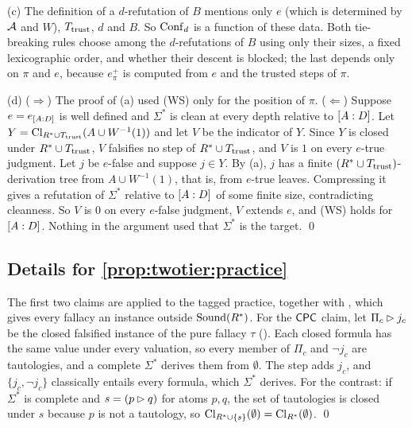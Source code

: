 (c) The definition of a $d$-refutation of $B$ mentions only $e$ (which is determined by $\mathcal{A}$ and $W$), $T_{\mathrm{trust}}$, $d$ and $B$. So $\mathrm{Conf}_d$ is a function of these data. Both tie-breaking rules choose among the $d$-refutations of $B$ using only their sizes, a fixed lexicographic order, and whether their descent is blocked; the last depends only on $\pi$ and $e$, because $e^+_\pi$ is computed from $e$ and the trusted steps of $\pi$.

(d) ($\Rightarrow$) The proof of (a) used (WS) only for the position of $\pi$. ($\Leftarrow$) Suppose $e=e_{[A : D]}$ is well defined and $\Sigma^*$ is clean at every depth relative to $[A : D]$. Let $Y=\mathrm{Cl}_{R^{*}\cup T_{\mathrm{trust}}}(A\cup W^{-1}(1))$ and let $V$ be the indicator of $Y$. Since $Y$ is closed under $R^{*}\cup T_{\mathrm{trust}}$, $V$ falsifies no step of $R^{*}\cup T_{\mathrm{trust}}$, and $V$ is $1$ on every $e$-true judgment. Let $j$ be $e$-false and suppose $j\in Y$. By (a), $j$ has a finite $(R^{*}\cup T_{\mathrm{trust}})$-derivation tree from $A\cup W^{-1}(1)$, that is, from $e$-true leaves. Compressing it gives a refutation of $\Sigma^*$ relative to $[A : D]$ of some finite size, contradicting cleanness. So $V$ is $0$ on every $e$-false judgment, $V$ extends $e$, and (WS) holds for $[A : D]$. Nothing in the argument used that $\Sigma^*$ is the target. \qed

\subsection{Details for \texorpdfstring{\cref{prop:twotier:practice}}{the practice proposition}}\label{app:twotier:practice}

The first two claims are  applied to the tagged practice, together with , which gives every fallacy an instance outside $\mathrm{Sound}(R^{*})$. For the $\mathsf{CPC}$ claim, let $\Pi_c\rhd j_c$ be the closed falsified instance of the pure fallacy $\tau$ (). Each closed formula has the same value under every valuation, so every member of $\Pi_c$ and $\neg j_c$ are tautologies, and a complete $\Sigma^*$ derives them from $\emptyset$. The step adds $j_c$, and $\{j_c,\neg j_c\}$ classically entails every formula, which $\Sigma^*$ derives. For the contrast: if $\Sigma^*$ is complete and $s=(p\rhd q)$ for atoms $p,q$, the set of tautologies is closed under $s$ because $p$ is not a tautology, so $\mathrm{Cl}_{R^{*}\cup\{s\}}(\emptyset)=\mathrm{Cl}_{R^{*}}(\emptyset)$. \qed

